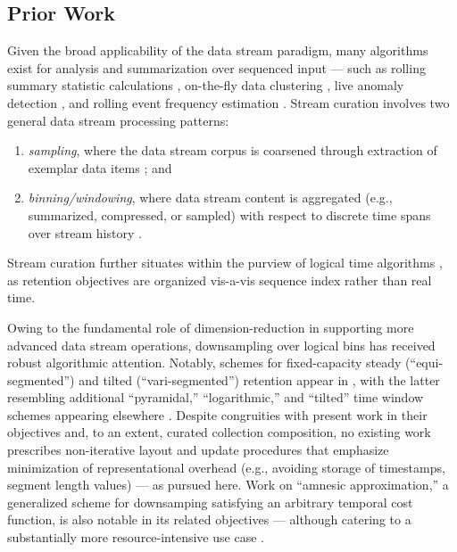 \subsection{Prior Work}
\label{sec:prior-work}

Given the broad applicability of the data stream paradigm, many algorithms exist for analysis and summarization over sequenced input --- such as rolling summary statistic calculations \citep{lin2004continuously}, on-the-fly data clustering \citep{silva2013data}, live anomaly detection \citep{cai2004maids}, and rolling event frequency estimation \citep{manku2002approximate}.
Stream curation involves two general data stream processing patterns:
\begin{enumerate}
\item \textit{sampling}, where the data stream corpus is coarsened through extraction of exemplar data items \citep{sibai2016sampling}; and
\item \textit{binning/windowing}, where data stream content is aggregated (e.g., summarized, compressed, or sampled) with respect to discrete time spans over stream history \citep{gama2007data}.
\end{enumerate}
Stream curation further situates within the purview of logical time algorithms \citep{sibai2016sampling}, as retention objectives are organized vis-a-vis sequence index rather than real time.

Owing to the fundamental role of dimension-reduction in supporting more advanced data stream operations, downsampling over logical bins has received robust algorithmic attention.
Notably, schemes for fixed-capacity steady (``equi-segmented'') and tilted (``vari-segmented'') retention appear in \citep{zhao2005generalized}, with the latter resembling additional ``pyramidal,'' ``logarithmic,'' and ``tilted'' time window schemes appearing elsewhere \citep{aggarwal2003framework,han2005stream,giannella2003mining,phithakkitnukoon2010recent}.
Despite congruities with present work in their objectives and, to an extent, curated collection composition, no existing work prescribes non-iterative layout and update procedures that emphasize minimization of representational overhead (e.g., avoiding storage of timestamps, segment length values) --- as pursued here.
Work on ``amnesic approximation,'' a generalized scheme for downsamping satisfying an arbitrary temporal cost function, is also notable in its related objectives --- although catering to a substantially more resource-intensive use case \citep{palpanas2004online}.

